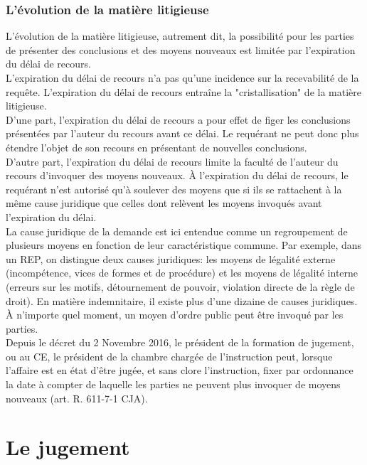 \documentclass[10pt, a4paper, openany]{book}
\begin{document}
\subsection{L'évolution de la matière litigieuse}

L'évolution de la matière litigieuse, autrement dit, la possibilité pour les parties de présenter des conclusions et des moyens nouveaux est limitée par l'expiration du délai de recours. \\
L'expiration du délai de recours n'a pas qu'une incidence sur la recevabilité de la requête. L'expiration du délai de recours entraîne la "cristallisation" de la matière litigieuse. \\
D'une part, l'expiration du délai de recours a pour effet de figer les conclusions présentées par l'auteur du recours avant ce délai. Le requérant ne peut donc plus étendre l'objet de son recours en présentant de nouvelles conclusions. \\
D'autre part, l'expiration du délai de recours limite la faculté de l'auteur du recours d'invoquer des moyens nouveaux. À l'expiration du délai de recours, le requérant n'est autorisé qu'à soulever des moyens que si ils se rattachent à la même cause juridique que celles dont relèvent les moyens invoqués avant l'expiration du délai. \\
La cause juridique de la demande est ici entendue comme un regroupement de plusieurs moyens en fonction de leur caractéristique commune. Par exemple, dans un REP, on distingue deux causes juridiques: les moyens de légalité externe (incompétence, vices de formes et de procédure) et les moyens de légalité interne (erreurs sur les motifs, détournement de pouvoir, violation directe de la règle de droit). En matière indemnitaire, il existe plus d'une dizaine de causes juridiques. \\
À n'importe quel moment, un moyen d'ordre public peut être invoqué par les parties. \\
Depuis le décret du 2 Novembre 2016, le président de la formation de jugement, ou au CE, le président de la chambre chargée de l'instruction peut, lorsque l'affaire est en état d'être jugée, et sans clore l'instruction, fixer par ordonnance la date à compter de laquelle les parties ne peuvent plus invoquer de moyens nouveaux (art. R. 611-7-1 CJA). 

\chapter{Le jugement}
\end{document}
